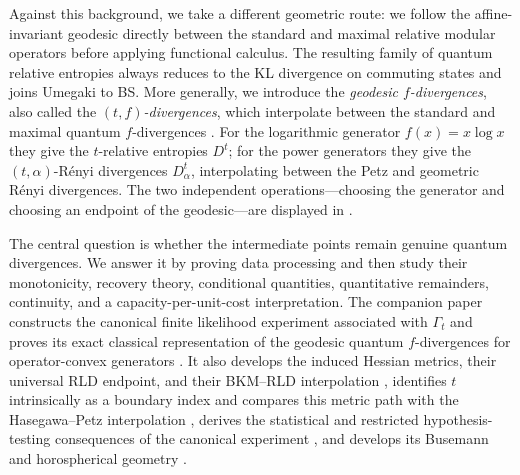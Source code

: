 \documentclass[11pt]{article}
\theoremstyle{remark}
\newcommand{\1}{\mathbbm{1}}
\begin{document}
Against this background, we take a different geometric route: we
follow the affine-invariant geodesic directly between the standard and
maximal relative modular operators before applying functional
calculus.  The resulting family of quantum relative entropies always
reduces to the KL divergence on commuting states and joins Umegaki to
BS.  More generally, we introduce the \emph{geodesic
$f$-divergences}, also called the \emph{$(t,f)$-divergences}, which
interpolate between the standard and maximal quantum
$f$-divergences \cite{hiai2017different}.  For the logarithmic generator $f(x)=x\log x$ they
give the $t$-relative entropies $D^t$; for the power generators they
give the $(t,\alpha)$-R\'enyi divergences $D_\alpha^t$, interpolating
between the Petz and geometric R\'enyi divergences.  The two
independent operations---choosing the generator and choosing an
endpoint of the geodesic---are displayed in
.

The central question is whether the intermediate points remain
genuine quantum divergences.  We answer it by proving data processing
and then study their monotonicity, recovery theory, conditional
quantities, quantitative remainders, continuity, and a
capacity-per-unit-cost interpretation.  The companion paper constructs
the canonical finite likelihood experiment associated with $\Gamma_t$
and proves its exact classical representation of the geodesic quantum
$f$-divergences for operator-convex generators
\cite[Theorem~3.1]{capel2026informationgeometry}.  It also develops the
induced Hessian metrics, their universal RLD endpoint, and their
BKM--RLD interpolation
\cite[Theorem~2.3, Corollary~2.4, and Theorem~2.5]{capel2026informationgeometry},
identifies $t$ intrinsically as a boundary index and compares this
metric path with the Hasegawa--Petz interpolation
\cite[Theorem~2.6 and Proposition~2.7]{capel2026informationgeometry},
derives the statistical and restricted hypothesis-testing consequences
of the canonical experiment
\cite[Propositions~3.2--3.3]{capel2026informationgeometry}, and
develops its Busemann and horospherical geometry
\cite[Propositions~4.1--4.2 and Section~4.3]{capel2026informationgeometry}.
\end{document}
